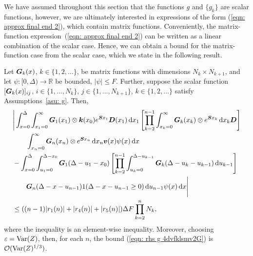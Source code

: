 We have assumed throughout this section that the functions \(g\) and \(\{g_k\}\) are scalar functions, however, we are ultimately interested in expressions of the form (\ref{eqn: approx final end 2}), which contain matrix functions. Conveniently, the matrix-function expression~(\ref{eqn: approx final end 2}) can be written as a linear combination of the scalar case. Hence, we can obtain a bound for the matrix-function case from the scalar case, which we state in the following result.
\begin{lem}\label{lem: boobies}
	Let \(\boldsymbol G_k(x)\), \(k\in\{1,2,...\}\), be matrix functions with dimensions \(N_k \times N_{k+1}\), and let \(\psi:[0,\Delta)\to\mathbb R\) be bounded, \(|\psi|\leq F\). Further, suppose the scalar function \([\boldsymbol G_k(x)]_{ij}\), \(i\in\{1,...,N_{k}\}\), \(j\in\{1,...,N_{k+1}\}\), \(k\in\{1,2,...\}\) satisfy Assumptions~\ref{asu: g}. Then, 
	\begin{align}
		&\Bigg| \int_{x=0}^\Delta \int_{x_1=0}^\infty \boldsymbol G_1(x_1) \otimes \boldsymbol k(x_0) e^{\boldsymbol{S}x_1} \boldsymbol D (x_1) \, \mathrm{d} x_1
		\left[\prod_{k=2}^{n-1}\int_{x_k=0}^\infty \boldsymbol G_{k }(x_k) \otimes e^{\boldsymbol{S}x_k} \, \mathrm{d} x_k \boldsymbol D\right] \nonumber
\\&\qquad{}\int_{x_n=0}^\infty \boldsymbol G_{n }(x_n)\otimes e^{\boldsymbol{S}x_n} \, \mathrm{d} x_n {\boldsymbol v}(x) \psi(x) \, \mathrm{d} x \nonumber 
		\\&{}- \int_{x=0}^\Delta \int_{u_1=0}^{\Delta-x_0}\boldsymbol G_1(\Delta - u_1 - x_0)
		\left[\prod_{k=2}^{n-1} \int_{u_k=0}^{\Delta-u_{k-1}} \boldsymbol G_{k}(\Delta-u_k-u_{k-1})\, \mathrm{d} u_{k-1}\right] \nonumber 
				\\&\qquad{} \boldsymbol G_{n }(\Delta - x-u_{n-1})
			1(\Delta-x-u_{n-1}\geq0) \, \mathrm{d} u_{n-1}\psi(x) \, \mathrm{d} x \Bigg| \nonumber
		\\&\leq ((n-1)|r_1(n)| + |r_4(n)| + |r_5(n)|)\Delta F \prod_{k=2}^{n}N_{k}, \label{eqn: rhs g 4dvfklsmv2G}
	\end{align}
	where the inequality is an element-wise inequality. Moreover, choosing \(\varepsilon=\mathrm{Var}(Z)\), then, for each \(n\), the bound (\ref{eqn: rhs g 4dvfklsmv2G}) is \(\mathcal O(\mathrm{Var}(Z)^{1/3})\). 
\end{lem}
